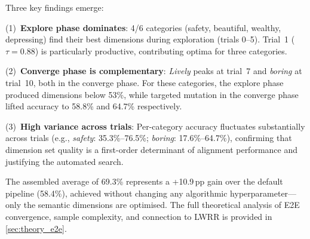 \documentclass[runningheads]{llncs}
\begin{document}
Three key findings emerge:

\noindent(1)~\textbf{Explore phase dominates}: 4/6 categories (safety, beautiful, wealthy, depressing) find their best dimensions during exploration (trials 0--5). Trial~1 ($\tau{=}0.88$) is particularly productive, contributing optima for three categories.

\noindent(2)~\textbf{Converge phase is complementary}: \emph{Lively} peaks at trial~7 and \emph{boring} at trial~10, both in the converge phase. For these categories, the explore phase produced dimensions below 53\%, while targeted mutation in the converge phase lifted accuracy to 58.8\% and 64.7\% respectively.

\noindent(3)~\textbf{High variance across trials}: Per-category accuracy fluctuates substantially across trials (e.g., \emph{safety}: 35.3\%--76.5\%; \emph{boring}: 17.6\%--64.7\%), confirming that dimension set quality is a first-order determinant of alignment performance and justifying the automated search.

The assembled average of 69.3\% represents a +10.9\,pp gain over the default pipeline (58.4\%), achieved without changing any algorithmic hyperparameter---only the semantic dimensions are optimised.
The full theoretical analysis of E2E convergence, sample complexity, and connection to LWRR is provided in \cref{sec:theory_e2e}.
\end{document}
